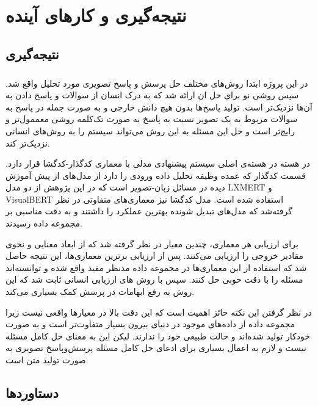 
\chapter{نتیجه‌گیری و کارهای آینده} \label{ch:concl}
\thispagestyle{empty}


\section{نتیجه‌گیری}
\paragraph{}
{
      در این پروژه ابتدا روش‌های مختلف حل پرسش و پاسخ تصویری مورد تحلیل واقع شد.
      سپس روشی نو برای حل ان ارائه شد که به درک انسان از سوالات و پاسخ دادن به آن‌ها نزدیک‌‌تر است. تولید پاسخ‌ها 
      بدون هیچ دانش خارجی و به صورت جمله در پاسخ به سوالات مربوط به یک تصویر نسبت به پاسخ به صورت تک‌کلمه
      روشی معممول‌تر و رایج‌تر است و حل این مسئله به این روش می‌تواند سیستم را به روش‌های انسانی نزدیک‌تر کند.

      در هسته
      در هسته‌ی اصلی سیستم پیشنهادی مدلی با معماری
      کدگذار-کدگشا قرار دارد.
      قسمت کدگذار که عمده وظیفه تحلیل داده 
      ورودی را دارد از مدل‌های از پیش آموزش‌ دیده در مسائل زبان-تصویر است که 
      در این پژوهش از دو مدل 
      LXMERT
      و
      VisualBERT
      استفاده شده است. 
      مدل کدگشا نیز معماری‌های متفاوتی در نظر گرفته‌شد که مدل‌های تبدیل شونده 
      بهترین عملکرد را داشتند و به دقت مناسبی بر مجموعه داده رسیدند. 

      برای ارزیابی هر معماری، چندین معیار در نظر گرفته شد که از 
      ابعاد معنایی و نحوی مقادیر خروجی را ارزیابی می‌کنند.
      پس از ارزیابی برترین معماری‌ها، این نتیجه حاصل شد که 
      استفاده از این معماری‌ها در مجموعه داده مدنظر مفید واقع شده
      و توانسته‌اند مسئله را با دقت خوبی حل کنند. سپس با روش های
      ارزیابی انسانی ثابت شد که این روش به رفع ابهامات در پرسش
      کمک بسیاری می‌کند. 

      در نظر گرفتن این نکته حائز اهمیت است که این دقت بالا 
      در معیار‌ها واقعی نیست زیرا مجموعه داده از داده‌های موجود در
      دنیای بیرون بسیار متفاوت‌تر است و به صورت خودکار 
      تولید شده‌اند و حالت طبیعی خود را ندارند. لیکن این به معنای حل
      کامل مسئله نیست و لازم به اعمال بسیاری 
      برای ادعای حل کامل مسئله پرسش‌وپاسخ تصویری به صورت تولید متن است. 
}

\section{دستاوردها}

